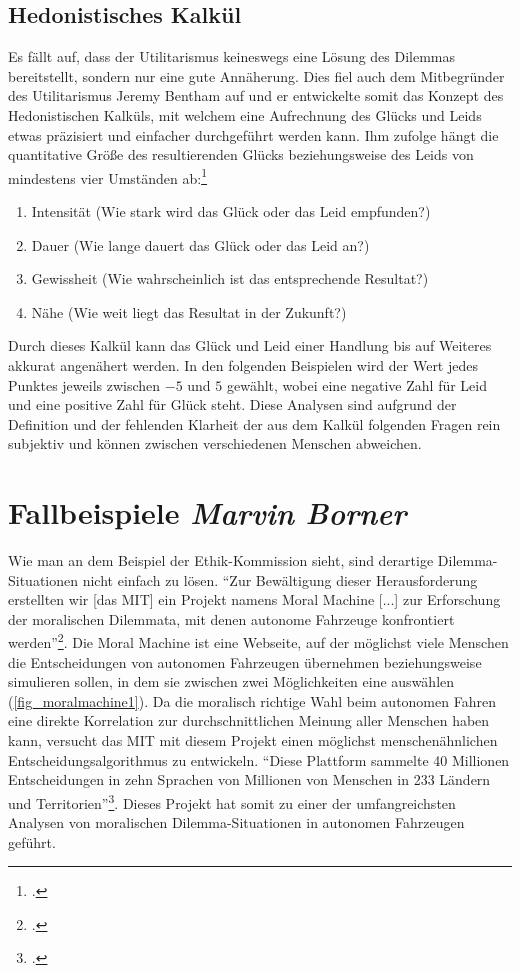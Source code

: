 \documentclass[a4paper, 12pt, openany]{book}
\newcommand\Section[2]{\section[#1 {\scriptsize\itshape#2}]{#1 \footnotesize\itshape#2}}
\begin{document}
            \subsection{Hedonistisches Kalkül}
                Es fällt auf, dass der Utilitarismus keineswegs eine Lösung des Dilemmas bereitstellt, sondern nur eine gute Annäherung. Dies fiel auch dem Mitbegründer des Utilitarismus Jeremy Bentham auf und er entwickelte somit das Konzept des Hedonistischen Kalküls, mit welchem eine Aufrechnung des Glücks und Leids etwas präzisiert und einfacher durchgeführt werden kann. Ihm zufolge hängt die quantitative Größe des resultierenden Glücks beziehungsweise des Leids von mindestens vier Umständen ab:\footcite[105--106]{prechtl1995bentham}
                \begin{enumerate}
                    \item Intensität (Wie stark wird das Glück oder das Leid empfunden?)
                    \item Dauer (Wie lange dauert das Glück oder das Leid an?)
                    \item Gewissheit (Wie wahrscheinlich ist das entsprechende Resultat?)
                    \item Nähe (Wie weit liegt das Resultat in der Zukunft?)
                \end{enumerate}
                Durch dieses Kalkül kann das Glück und Leid einer Handlung bis auf Weiteres akkurat angenähert werden. In den folgenden Beispielen wird der Wert jedes Punktes jeweils zwischen $-5$ und $5$ gewählt, wobei eine negative Zahl für Leid und eine positive Zahl für Glück steht. Diese Analysen sind aufgrund der Definition und der fehlenden Klarheit der aus dem Kalkül folgenden Fragen rein subjektiv und können zwischen verschiedenen Menschen abweichen.

        \Section{Fallbeispiele}{Marvin Borner} %
            Wie man an dem Beispiel der Ethik-Kommission sieht, sind derartige Dilemma-Situationen nicht einfach zu lösen. \enquote{Zur Bewältigung dieser Herausforderung erstellten wir [das MIT] ein Projekt namens Moral Machine [...] zur Erforschung der moralischen Dilemmata, mit denen autonome Fahrzeuge konfrontiert werden}\footcite[59]{awad2018moral}. Die Moral Machine ist eine Webseite, auf der möglichst viele Menschen die Entscheidungen von autonomen Fahrzeugen übernehmen beziehungsweise simulieren sollen, in dem sie zwischen zwei Möglichkeiten eine auswählen (\autoref{fig_moralmachine1}). Da die moralisch richtige Wahl beim autonomen Fahren eine direkte Korrelation zur durchschnittlichen Meinung aller Menschen haben kann, versucht das MIT mit diesem Projekt einen möglichst menschenähnlichen Entscheidungsalgorithmus zu entwickeln. \enquote{Diese Plattform sammelte 40 Millionen Entscheidungen in zehn Sprachen von Millionen von Menschen in 233 Ländern und Territorien}\footcite[59]{awad2018moral}. Dieses Projekt hat somit zu einer der umfangreichsten Analysen von moralischen Dilemma-Situationen in autonomen Fahrzeugen geführt.
\end{document}
